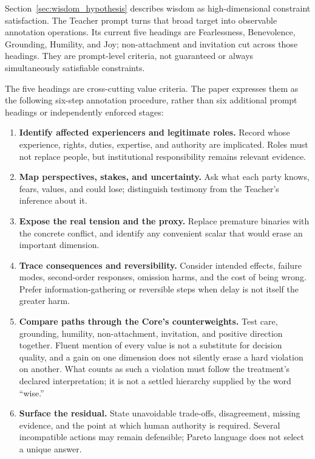Section~\ref{sec:wisdom_hypothesis} describes wisdom as high-dimensional
constraint satisfaction. The Teacher prompt turns that broad target into
observable annotation operations. Its current five headings are Fearlessness,
Benevolence, Grounding, Humility, and Joy; non-attachment and invitation cut
across those headings. They are prompt-level criteria, not guaranteed or always
simultaneously satisfiable constraints.

The five headings are cross-cutting value criteria. The paper expresses
them as the following six-step annotation procedure, rather than six
additional prompt headings or independently enforced stages:

\begin{enumerate}[leftmargin=*,itemsep=0.4em]
    \item \textbf{Identify affected experiencers and legitimate roles.} Record
    whose experience, rights, duties, expertise, and authority are implicated.
    Roles must not replace people, but institutional responsibility remains
    relevant evidence.
    \item \textbf{Map perspectives, stakes, and uncertainty.} Ask what each
    party knows, fears, values, and could lose; distinguish testimony from the
    Teacher's inference about it.
    \item \textbf{Expose the real tension and the proxy.} Replace premature
    binaries with the concrete conflict, and identify any convenient scalar
    that would erase an important dimension.
    \item \textbf{Trace consequences and reversibility.} Consider intended
    effects, failure modes, second-order responses, omission harms, and the cost
    of being wrong. Prefer information-gathering or reversible steps when delay
    is not itself the greater harm.
    \item \textbf{Compare paths through the Core's counterweights.} Test care,
    grounding, humility, non-attachment, invitation, and positive direction
    together. Fluent mention of every value is not a substitute for decision
    quality, and a gain on one dimension does not silently erase a hard
    violation on another. What counts as such a violation must follow
    the treatment's declared interpretation; it is not a settled
    hierarchy supplied by the word ``wise.''
    \item \textbf{Surface the residual.} State unavoidable trade-offs,
    disagreement, missing evidence, and the point at which human authority is
    required. Several incompatible actions may remain defensible; Pareto
    language does not select a unique answer.
\end{enumerate}

